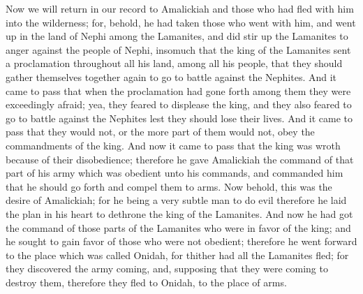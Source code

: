 Now we will return in our record to Amalickiah and those who had fled with him into the wilderness; for, behold, he had taken those who went with him, and went up in the land of Nephi among the Lamanites, and did stir up the Lamanites to anger against the people of Nephi, insomuch that the king of the Lamanites sent a proclamation throughout all his land, among all his people, that they should gather themselves together again to go to battle against the Nephites.
\bverse \iffalse And it came to pass that when the proclamation had gone forth among them they were exceedingly afraid; yea, they feared to displease the king, and they also feared to go to battle against the Nephites lest they should lose their lives. And it came to pass that they would not, or the more part of them would not, obey the commandments of the king. \fi
And it came to pass that when the proclamation had gone forth among them they were exceedingly afraid; yea, they feared to displease the king, and they also feared to go to battle against the Nephites lest they should lose their lives. And it came to pass that they would not, or the more part of them would not, obey the commandments of the king.
\bverse \iffalse And now it came to pass that the king was wroth because of their disobedience; therefore he gave Amalickiah the command of that part of his army which was obedient unto his commands, and commanded him that he should go forth and compel them to arms. \fi
And now it came to pass that the king was wroth because of their disobedience; therefore he gave Amalickiah the command of that part of his army which was obedient unto his commands, and commanded him that he should go forth and compel them to arms.
\bverse \iffalse Now behold, this was the desire of Amalickiah; for he being a very subtle man to do evil therefore he laid the plan in his heart to dethrone the king of the Lamanites. \fi
Now behold, this was the desire of Amalickiah; for he being a very subtle man to do evil therefore he laid the plan in his heart to dethrone the king of the Lamanites.
\bverse \iffalse And now he had got the command of those parts of the Lamanites who were in favor of the king; and he sought to gain favor of those who were not obedient; therefore he went forward to the place which was called Onidah, for thither had all the Lamanites fled; for they discovered the army coming, and, supposing that they were coming to destroy them, therefore they fled to Onidah, to the place of arms. \fi
And now he had got the command of those parts of the Lamanites who were in favor of the king; and he sought to gain favor of those who were not obedient; therefore he went forward to the place which was called Onidah, for thither had all the Lamanites fled; for they discovered the army coming, and, supposing that they were coming to destroy them, therefore they fled to Onidah, to the place of arms.
